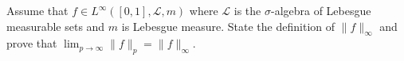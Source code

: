 Assume that $f\in L^{\infty}([0,1],\mathcal{L},m)$ where $\mathcal{L}$
is the $\sigma$-algebra of Lebesgue measurable sets and $m$ is
Lebesgue measure. State the definition of $\|f\|_{\infty}$ and prove
that $\lim_{p\rightarrow \infty}\|f\|_p=\|f\|_{\infty}$.
